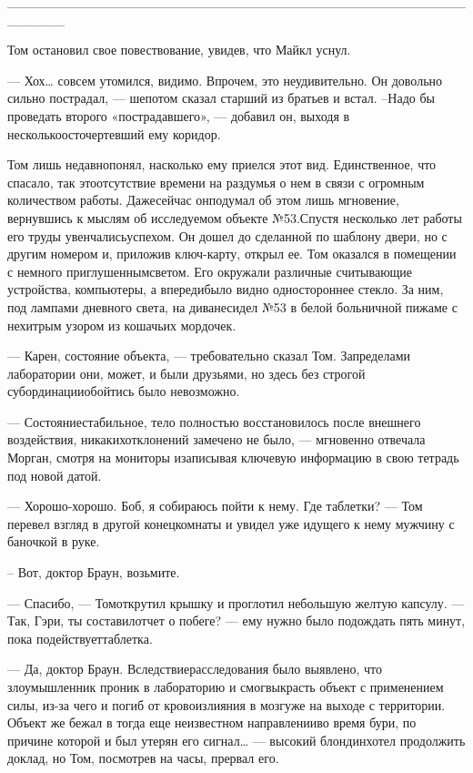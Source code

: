 ______________________________________________________

Том остановил свое повествование, увидев, что Майкл уснул.

— Хох… совсем утомился, видимо. Впрочем, это неудивительно. Он довольно сильно пострадал, — шепотом сказал старший из братьев и встал. –Надо бы проведать второго «пострадавшего», — добавил он, выходя в несколькоосточертевший ему коридор.

Том лишь недавнопонял, насколько ему приелся этот вид. Единственное, что спасало, так этоотсутствие времени на раздумья о нем в связи с огромным количеством работы. Дажесейчас онподумал об этом лишь мгновение, вернувшись к мыслям об исследуемом объекте №53.Спустя несколько лет работы его труды увенчалисьуспехом. Он дошел до сделанной по шаблону двери, но с другим номером и, приложив ключ-карту, открыл ее. Том оказался в помещении с немного приглушеннымсветом. Его окружали различные считывающие устройства, компьютеры, а впередибыло видно одностороннее стекло. За ним, под лампами дневного света, на диванесидел №53 в белой больничной пижаме с нехитрым узором из кошачьих мордочек.

— Карен, состояние объекта, — требовательно сказал Том. Запределами лаборатории они, может, и были друзьями, но здесь без строгой субординацииобойтись было невозможно.

— Состояниестабильное, тело полностью восстановилось после внешнего воздействия, никакихотклонений замечено не было, — мгновенно отвечала Морган, смотря на мониторы изаписывая ключевую информацию в свою тетрадь под новой датой.

— Хорошо-хорошо. Боб, я собираюсь пойти к нему. Где таблетки? — Том перевел взгляд в другой конецкомнаты и увидел уже идущего к нему мужчину с баночкой в руке.

– Вот, доктор Браун, возьмите.

— Спасибо, — Томоткрутил крышку и проглотил небольшую желтую капсулу. — Так, Гэри, ты составилотчет о побеге? — ему нужно было подождать пять минут, пока подействуеттаблетка.

— Да, доктор Браун. Вследствиерасследования было выявлено, что злоумышленник проник в лабораторию и смогвыкрасть объект с применением силы, из-за чего и погиб от кровоизлияния в мозгуже на выходе с территории. Объект же бежал в тогда еще неизвестном направленииво время бури, по причине которой и был утерян его сигнал… — высокий блондинхотел продолжить доклад, но Том, посмотрев на часы, прервал его.

